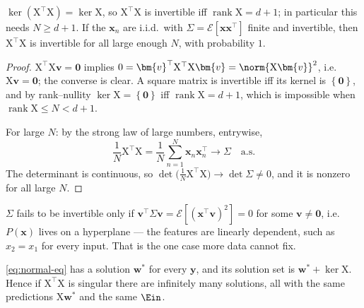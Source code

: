 \begin{lemma}
    \label{lem:xtx-invertible}
    \(\ker(\mathrm{X}^\top \mathrm{X}) = \ker \mathrm{X}\), so
    \(\mathrm{X}^\top \mathrm{X}\) is invertible iff \(\operatorname{rank}
    \mathrm{X} = d + 1\); in particular this needs \(N \ge d + 1\). If the
    \(\bm{x}_n\) are i.i.d.\ with \(\Sigma = \mathcal{E}[\bm{x} \bm{x}^\top]\)
    finite and invertible, then \(\mathrm{X}^\top \mathrm{X}\) is invertible for
    all large enough \(N\), with probability \(1\).
\end{lemma}

\begin{proof}
    \(\mathrm{X}^\top \mathrm{X} \bm{v} = \bm{0}\) implies \(0 = \bm{v}^\top
    \mathrm{X}^\top \mathrm{X} \bm{v} = \norm{\mathrm{X} \bm{v}}^2\), i.e.\
    \(\mathrm{X} \bm{v} = \bm{0}\); the converse is clear. A square matrix is
    invertible iff its kernel is \(\left\{ \bm{0} \right\}\), and by
    rank--nullity \(\ker \mathrm{X} = \left\{ \bm{0} \right\}\) iff
    \(\operatorname{rank} \mathrm{X} = d + 1\), which is impossible when
    \(\operatorname{rank} \mathrm{X} \le N < d + 1\).

    For large \(N\): by the strong law of large numbers, entrywise,
    \[
        \frac{1}{N} \mathrm{X}^\top \mathrm{X} = \frac{1}{N} \sum_{n=1}^N
        \bm{x}_n \bm{x}_n^\top \longrightarrow \Sigma \quad \text{a.s.}
    \]
    The determinant is continuous, so \(\det \bigl( \frac{1}{N} \mathrm{X}^\top
    \mathrm{X} \bigr) \to \det \Sigma \neq 0\), and it is nonzero for all large
    \(N\).
\end{proof}

\(\Sigma\) fails to be invertible only if \(\bm{v}^\top \Sigma \bm{v} =
\mathcal{E}[(\bm{x}^\top \bm{v})^2] = 0\) for some \(\bm{v} \neq \bm{0}\), i.e.\
\(P(\bm{x})\) lives on a hyperplane --- the features are linearly dependent,
such as \(x_2 = x_1\) for every input. That is the one case more data cannot
fix.

\begin{lemma}
    \label{lem:normal-eq}
    \eqref{eq:normal-eq} has a solution \(\bm{w}^*\) for every \(\bm{y}\), and
    its solution set is \(\bm{w}^* + \ker \mathrm{X}\). Hence if
    \(\mathrm{X}^\top \mathrm{X}\) is singular there are infinitely many
    solutions, all with the same predictions \(\mathrm{X} \bm{w}^*\) and the
    same \(\Ein\).
\end{lemma}

